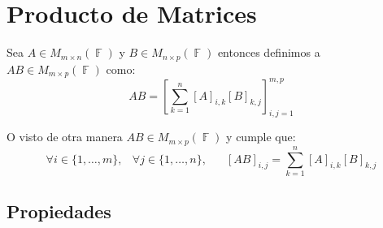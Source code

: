\documentclass[12pt, fleqn]{report}                             %
\DeclareMathOperator \Space {\quad}                             %
\DeclareMathOperator \MiniSpace {\;}                            %
\theoremstyle{break}                                            %
\DeclareMathOperator \GenericField {\mathbb{F}}                 %
\newcommand{\Brackets}[1]    {\left[ #1 \right]}                %
\begin{document}
        \clearpage
        \section{Producto de Matrices}

            Sea $A \in M_{m \times n}(\GenericField)$ y $B \in M_{n \times p}(\GenericField)$
            entonces definimos a $AB \in M_{m \times p}(\GenericField)$ como:
            \begin{equation*}
                AB = \Brackets{ \sum_{k = 1}^n [A]_{i, k} [B]_{k, j} }_{i, j = 1}^{m, p}
            \end{equation*}

            O visto de otra manera $AB \in M_{m \times p}(\GenericField)$ y cumple que:
            \begin{equation*}
                \forall i \in \{1, \dots, m\} ,\MiniSpace
                    \forall j \in \{1, \dots, n\} ,\Space
                        [AB]_{i, j} = \sum_{k = 1}^n [A]_{i, k} [B]_{k, j}
            \end{equation*}


            \vspace{2em}
            \subsection{Propiedades}
\end{document}
